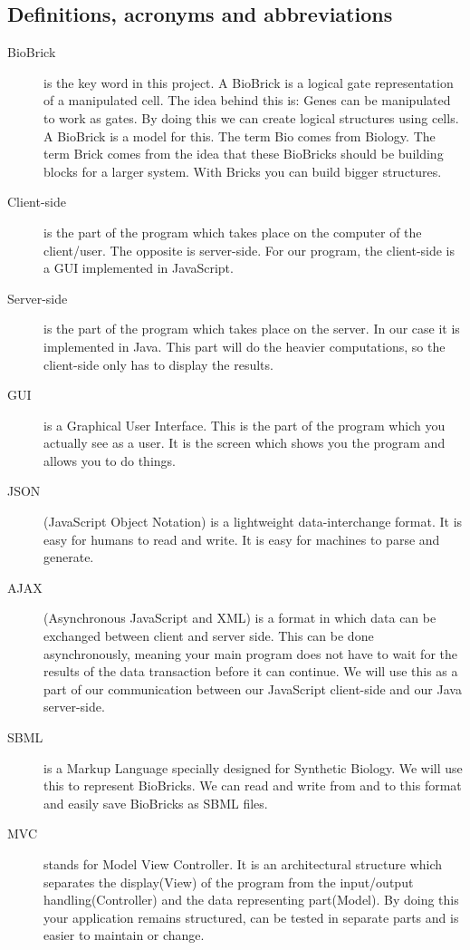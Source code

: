 \documentclass[a4paper]{article}
\begin{document}
\subsection{Definitions, acronyms and abbreviations}
\begin{description}
	\item[BioBrick] is the key word in this project. A BioBrick is a logical gate representation of a manipulated cell. The idea behind this is: Genes can be manipulated to work as gates. By doing this we can create logical structures using cells. A BioBrick is a model for this. The term Bio comes from Biology. The term Brick comes from the idea that these BioBricks should be building blocks for a larger system. With Bricks you can build bigger structures. 
	\item[Client-side] is the part of the program which takes place on the computer of the client/user. The opposite is server-side. For our program, the client-side is a GUI implemented in JavaScript. 
	\item[Server-side] is the part of the program which takes place on the server. In our case it is implemented in Java. This part will do the heavier computations, so the client-side only has to display the results.
	\item[GUI] is a Graphical User Interface. This is the part of the program which you actually see as a user. It is the screen which shows you the program and allows you to do things. 
	\item[JSON] (JavaScript Object Notation) is a lightweight data-interchange format. It is easy for humans to read and write. It is easy for machines to parse and generate.
	\item[AJAX] (Asynchronous JavaScript and XML) is a format in which data can be exchanged between client and server side. This can be done asynchronously, meaning your main program does not have to wait for the results of the data transaction before it can continue. We will use this as a part of our communication between our JavaScript client-side and our Java server-side.
	\item[SBML] is a Markup Language specially designed for Synthetic Biology. We will use this to represent BioBricks. We can read and write from and to this format and easily save BioBricks as SBML files.

	\item[MVC] stands for Model View Controller. It is an architectural structure which separates the display(View) of the program from the input/output handling(Controller) and the data representing part(Model). By doing this your application remains structured, can be tested in separate parts and is easier to maintain or change.
\end{description}
\end{document}
